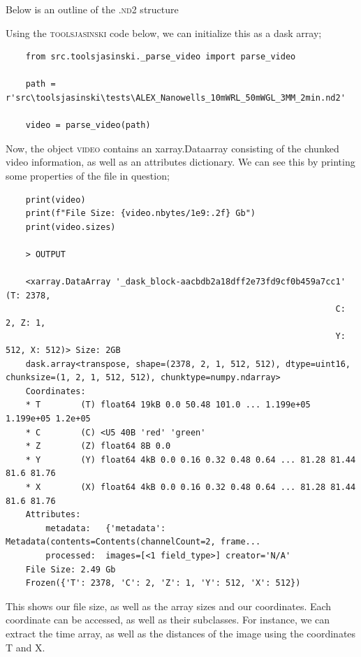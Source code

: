 Below is an outline of the  \textsc{.nd2} structure

Using the \textsc{toolsjasinski} code below, we can initialize this as a dask array;
\begin{verbatim}
    from src.toolsjasinski._parse_video import parse_video

    path = r'src\toolsjasinski\tests\ALEX_Nanowells_10mWRL_50mWGL_3MM_2min.nd2'

    video = parse_video(path)
\end{verbatim}
Now, the object \textsc{video} contains an xarray.Dataarray consisting of the chunked video information, as well as an attributes dictionary. We can see this by printing some properties of the file in question;

\begin{verbatim}
    print(video)
    print(f"File Size: {video.nbytes/1e9:.2f} Gb")
    print(video.sizes)

    > OUTPUT

    <xarray.DataArray '_dask_block-aacbdb2a18dff2e73fd9cf0b459a7cc1' (T: 2378,
                                                                  C: 2, Z: 1,
                                                                  Y: 512, X: 512)> Size: 2GB
    dask.array<transpose, shape=(2378, 2, 1, 512, 512), dtype=uint16, chunksize=(1, 2, 1, 512, 512), chunktype=numpy.ndarray>
    Coordinates:
    * T        (T) float64 19kB 0.0 50.48 101.0 ... 1.199e+05 1.199e+05 1.2e+05
    * C        (C) <U5 40B 'red' 'green'
    * Z        (Z) float64 8B 0.0
    * Y        (Y) float64 4kB 0.0 0.16 0.32 0.48 0.64 ... 81.28 81.44 81.6 81.76
    * X        (X) float64 4kB 0.0 0.16 0.32 0.48 0.64 ... 81.28 81.44 81.6 81.76
    Attributes:
        metadata:   {'metadata': Metadata(contents=Contents(channelCount=2, frame...
        processed:  images=[<1 field_type>] creator='N/A'
    File Size: 2.49 Gb
    Frozen({'T': 2378, 'C': 2, 'Z': 1, 'Y': 512, 'X': 512})
\end{verbatim}

This shows our file size, as well as the array sizes and our coordinates. Each coordinate can be accessed, as well as their subclasses. For instance, we can extract the time array, as well as the distances of the image using the coordinates \textsc{T} and \textsc{X}.

